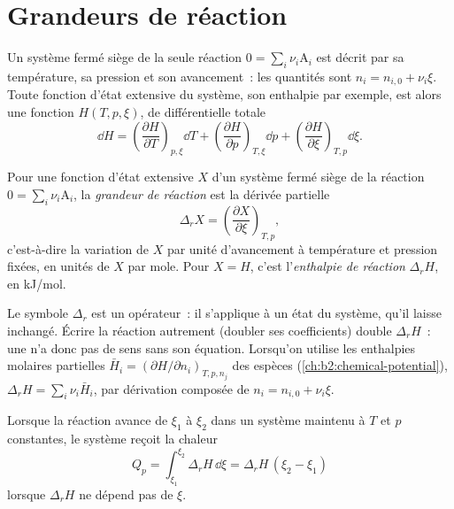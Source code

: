 \section{Grandeurs de réaction}

Un système fermé siège de la seule réaction $0 = \sum_i\nu_i\mathrm A_i$
est décrit par sa température, sa pression et son avancement~:
les quantités sont $n_i = n_{i,0} + \nu_i\xi$. Toute fonction d'état extensive
du système, son enthalpie par exemple, est alors une fonction $H(T, p,
\xi)$, de différentielle totale
\[
  \dd H = \left(\frac{\partial H}{\partial T}\right)_{p,\xi}\dd T
        + \left(\frac{\partial H}{\partial p}\right)_{T,\xi}\dd p
        + \left(\frac{\partial H}{\partial \xi}\right)_{T,p}\dd\xi .
\]

\begin{definition}\label{def:b2:reaction-enthalpy:reaction-quantity}
Pour une fonction d'état extensive $X$ d'un système fermé siège de la
réaction $0 = \sum_i\nu_i\mathrm A_i$, la \emph{grandeur de
réaction} est la dérivée partielle
\[
  \Delta_r X = \left(\frac{\partial X}{\partial \xi}\right)_{T,p} ,
\]
c'est-à-dire la variation de $X$ par unité d'avancement à température et
pression fixées, en unités de $X$ par mole. Pour $X = H$, c'est l'\emph{enthalpie
de réaction} $\Delta_r H$, en \unit{kJ/mol}.
\end{definition}

\begin{remark}\label{rem:b2:reaction-enthalpy:operator}
Le symbole $\Delta_r$ est un opérateur~: il s'applique à un état du
système, qu'il laisse inchangé. Écrire la réaction autrement (doubler ses
coefficients) double $\Delta_r H$~: une  n'a donc pas
de sens sans son équation. Lorsqu'on utilise les enthalpies molaires partielles
$\bar H_i = (\partial H/\partial n_i)_{T,p,n_j}$ des espèces
(\cref{ch:b2:chemical-potential}), $\Delta_r H = \sum_i\nu_i\bar H_i$, par
dérivation composée de $n_i = n_{i,0} + \nu_i\xi$.
\end{remark}

\begin{proposition}\label{prop:b2:reaction-enthalpy:qp}
Lorsque la réaction avance de $\xi_1$ à $\xi_2$ dans un système maintenu à
$T$ et $p$ constantes, le système reçoit la chaleur
\[
  Q_p = \int_{\xi_1}^{\xi_2}\Delta_r H\,\dd\xi = \Delta_r H\,(\xi_2 - \xi_1)
\]
lorsque $\Delta_r H$ ne dépend pas de $\xi$.
\end{proposition}


